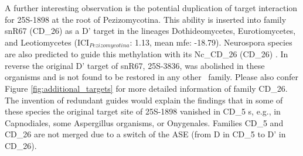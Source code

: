 A further interesting observation is the potential duplication of
target interaction for 25S-1898 at the root of Pezizomycotina. This
ability is inserted into family snR67 (CD\_26) as a D' target in the
lineages Dothideomycetes, Eurotiomycetes, and Leotiomycetes
(ICI$_{Pezizomycotina}$: 1.13, mean mfe: -18.79). Neurospora species
are also predicted to guide this methylation with its Nc\_CD\_26
(CD\_26) \sno \cite{Liu:2009}. In reverse the original D' target of
snR67, 25S-3836, was abolished in these organisms and is not found to
be restored in any other \sno\ family.  Please also confer Figure
\ref{fig:additional_targets} for more detailed information of family
CD\_26. The invention of redundant guides would explain the findings
that in some of these species the original target site of 25S-1898
vanished in CD\_5 \sno s, e.g., in Capnodiales, some Aspergillus
organisms, or Onygenales. Families CD\_5 and CD\_26 are not merged due
to a switch of the ASE (from D in CD\_5 to D' in CD\_26).  





